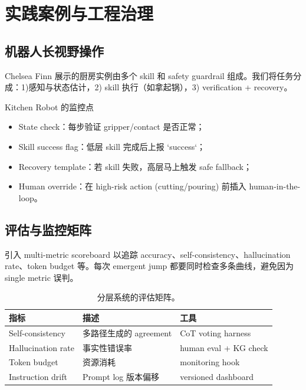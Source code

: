 \section{实践案例与工程治理}

\subsection{机器人长视野操作}

Chelsea Finn 展示的厨房实例由多个 skill 和 safety guardrail 组成。我们将任务分成：1)感知与状态估计，2) skill 执行（如拿起锅），3) verification + recovery。

\begin{knowledgebox}{Kitchen Robot 的监控点}
\begin{itemize}
    \item State check：每步验证 gripper/contact 是否正常；
    \item Skill success flag：低层 skill 完成后上报 `success`；
    \item Recovery template：若 skill 失败，高层马上触发 safe fallback；
    \item Human override：在 high-risk action (cutting/pouring) 前插入 human-in-the-loop。
\end{itemize}
\end{knowledgebox}

\subsection{评估与监控矩阵}

引入 multi-metric scoreboard 以追踪 accuracy、self-consistency、hallucination rate、token budget 等。每次 emergent jump 都要同时检查多条曲线，避免因为 single metric 误判。

\begin{table}[H]
\centering
\begin{tabular}{p{3.5cm}p{5cm}p{3cm}}
\toprule
指标 & 描述 & 工具 \\
\midrule
Self-consistency & 多路径生成的 agreement & CoT voting harness \\
Hallucination rate & 事实性错误率 & human eval + KG check \\
Token budget & 资源消耗 & monitoring hook \\
Instruction drift & Prompt log 版本偏移 & versioned dashboard \\
\bottomrule
\end{tabular}
\caption{分层系统的评估矩阵。}
\end{table}

